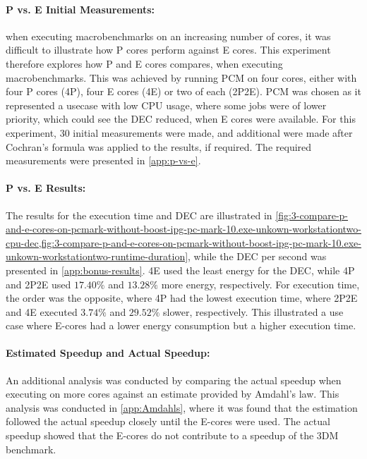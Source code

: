 \paragraph{P vs. E Initial Measurements:} when executing macrobenchmarks on an increasing number of cores, it was difficult to illustrate how P cores perform against E cores. This experiment therefore explores how P and E cores compares, when executing macrobenchmarks. This was achieved by running PCM on four cores, either with four P cores (4P), four E cores (4E) or two of each (2P2E). PCM was chosen as it represented a usecase with low CPU usage, where some jobs were of lower priority, which could see the DEC reduced, when E cores were available. For this experiment, $30$ initial measurements were made, and additional were made after Cochran's formula was applied to the results, if required. The required measurements were presented in \cref{app:p-vs-e}.



\paragraph{P vs. E Results:} The results for the execution time and DEC are illustrated in \cref{fig:3-compare-p-and-e-cores-on-pcmark-without-boost-ipg-pc-mark-10.exe-unkown-workstationtwo-cpu-dec,fig:3-compare-p-and-e-cores-on-pcmark-without-boost-ipg-pc-mark-10.exe-unkown-workstationtwo-runtime-duration}, while the DEC per second was presented in \cref{app:bonus-results}. 4E used the least energy for the DEC, while 4P and 2P2E used $17.40\%$ and $13.28\%$ more energy, respectively. For execution time, the order was the opposite, where 4P had the lowest execution time, where 2P2E and 4E executed $3.74\%$ and $29.52\%$ slower, respectively. This illustrated a use case where E-cores had a lower energy consumption but a higher execution time.  



\paragraph{Estimated Speedup and Actual Speedup:}
An additional analysis was conducted by comparing the actual speedup when executing on more cores against an estimate provided by Amdahl's law. This analysis was conducted in \cref{app:Amdahls}, where it was found that the estimation followed the actual speedup closely until the E-cores were used. The actual speedup showed that the E-cores do not contribute to a speedup of the 3DM benchmark.


